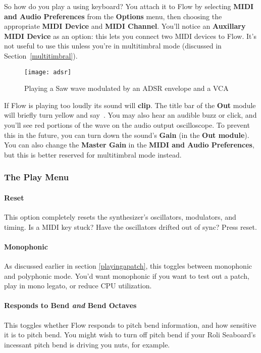 \documentclass{article}
\newcommand\name{Flow}
\begin{document}
So how do you play a using keyboard?  You attach it to {\name} by selecting {\bf MIDI and Audio Preferences} from the {\bf Options} menu, then choosing the appropriate {\bf MIDI Device} and {\bf MIDI Channel}.  You'll notice an {\bf Auxillary MIDI Device} as an option: this lets you connect two MIDI devices to Flow.  It's not useful to use this unless you're in multitimbral mode (discussed in Section~\ref{multitimbral}).

\begin{wrapfigure}{r}{3in}
\texttt{[image: adsr]}
\caption{Playing a Saw wave modulated by an ADSR envelope and a VCA}
\vspace{-1em}
\label{adsr}
\end{wrapfigure}

If Flow is playing too loudly its sound will {\bf clip}. The title bar of the {\bf Out} module will briefly turn yellow and say \,.  You may also hear an audible buzz or click, and you'll see red portions of the wave on the audio output oscilloscope.  To prevent this in the future, you can turn down the sound's {\bf Gain} (in the {\bf Out module}).  You can also change the {\bf Master Gain} in the {\bf MIDI and Audio Preferences}, but this is better reserved for multitimbral mode instead.

\subsubsection{The Play Menu}

\paragraph{Reset}  This option completely resets the synthesizer's oscillators, modulators, and timing.  Is a MIDI key stuck?  Have the oscillators drifted out of sync?  Press reset.

\paragraph{Monophonic}  As discussed earlier in section \ref{playingapatch}, this toggles between monophonic and polyphonic mode.  You'd want monophonic if you want to test out a patch, play in mono legato, or reduce CPU utilization.

\paragraph{Responds to Bend \textit{and} Bend Octaves}  This toggles whether Flow responds to pitch bend information, and how sensitive it is to pitch bend. You might wish to turn off pitch bend if your Roli Seaboard's incessant pitch bend is driving you nuts, for example.
\end{document}
